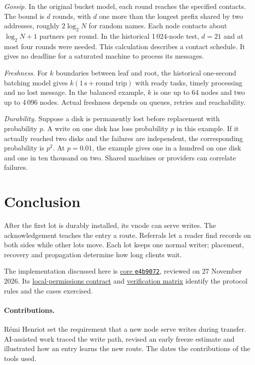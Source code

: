 \documentclass[11pt]{article}
\begin{document}
\textit{Gossip.} In the original bucket model, each round reaches the specified contacts. The bound is $d$ rounds, with $d$ one more than the longest prefix shared by two addresses, roughly $2\log_2 N$ for random names. Each node contacts about $\log_2 N+1$ partners per round. In the historical 1\,024-node test, $d=21$ and at most four rounds were needed. This calculation describes a contact schedule. It gives no deadline for a saturated machine to process its messages.

\textit{Freshness.} For $k$ boundaries between leaf and root, the historical one-second batching model gives $k(1\,\mathrm{s}+\text{round trip})$ with ready tasks, timely processing and no lost message. In the balanced example, $k$ is one up to 64 nodes and two up to 4\,096 nodes. Actual freshness depends on queues, retries and reachability.

\textit{Durability.} Suppose a disk is permanently lost before replacement with probability $p$. A write on one disk has loss probability $p$ in this example. If it actually reached two disks and the failures are independent, the corresponding probability is $p^2$. At $p=0.01$, the example gives one in a hundred on one disk and one in ten thousand on two. Shared machines or providers can correlate failures.

\section{Conclusion}
After the first lot is durably installed, its vnode can serve writes. The acknowledgement teaches the entry a route. Referrals let a reader find records on both sides while other lots move. Each lot keeps one normal writer; placement, recovery and propagation determine how long clients wait.

The implementation discussed here is \href{https://github.com/indexus/core/tree/e4b9072}{core \texttt{e4b9072}}, reviewed on 27 November 2026. Its \href{https://github.com/indexus/core/blob/e4b9072/docs/protocol/local-permissions.md}{local-permissions contract} and \href{https://github.com/indexus/core/blob/e4b9072/docs/protocol/local-permissions-verification.md}{verification matrix} identify the protocol rules and the cases exercised.

\paragraph{Contributions.} Rémi Henriot set the requirement that a new node serve writes during transfer. AI-assisted work traced the write path, revised an early freeze estimate and illustrated how an entry learns the new route. The  dates the contributions of the tools used.
\end{document}
